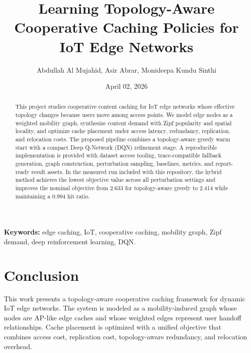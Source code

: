 \documentclass[11pt]{article}
\title{Learning Topology-Aware Cooperative Caching Policies for IoT Edge Networks}
\author{
    Abdullah Al Mujahid, Asir Abrar, Monideepa Kundu Sinthi
}
\date{April 02, 2026}
\begin{document}
\begingroup
{} %
\maketitle
\endgroup

\begin{abstract}
This project studies cooperative content caching for IoT edge networks whose effective topology changes because users move among access points. We model edge nodes as a weighted mobility graph, synthesize content demand with Zipf popularity and spatial locality, and optimize cache placement under access latency, redundancy, replication, and relocation costs. The proposed pipeline combines a topology-aware greedy warm start with a compact Deep Q-Network (DQN) refinement stage. A reproducible implementation is provided with dataset access tooling, trace-compatible fallback generation, graph construction, perturbation sampling, baselines, metrics, and report-ready result assets. In the measured run included with this repository, the hybrid method achieves the lowest objective value across all perturbation settings and improves the nominal objective from 2.633 for topology-aware greedy to 2.414 while maintaining a 0.994 hit ratio.
\end{abstract}

\textbf{Keywords:} edge caching, IoT, cooperative caching, mobility graph, Zipf demand, deep reinforcement learning, DQN.


% 



% 

% 
% 
% 


% 
% 






\section{Conclusion}

This work presents a topology-aware cooperative caching framework for dynamic IoT edge networks. The system is modeled as a mobility-induced graph whose nodes are AP-like edge caches and whose weighted edges represent user handoff relationships. Cache placement is optimized with a unified objective that combines access cost, replication cost, topology-aware redundancy, and relocation overhead.
\end{document}
